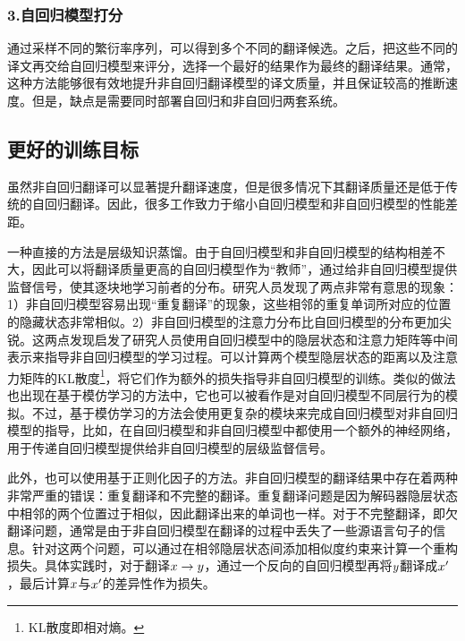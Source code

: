 \subsubsection{3.自回归模型打分}

\parinterval 通过采样不同的繁衍率序列，可以得到多个不同的翻译候选。之后，把这些不同的译文再交给自回归模型来评分，选择一个最好的结果作为最终的翻译结果。通常，这种方法能够很有效地提升非自回归翻译模型的译文质量，并且保证较高的推断速度。但是，缺点是需要同时部署自回归和非自回归两套系统。


\subsection{更好的训练目标}

\parinterval 虽然非自回归翻译可以显著提升翻译速度，但是很多情况下其翻译质量还是低于传统的自回归翻译。因此，很多工作致力于缩小自回归模型和非自回归模型的性能差距。

\parinterval 一种直接的方法是层级知识蒸馏。由于自回归模型和非自回归模型的结构相差不大，因此可以将翻译质量更高的自回归模型作为“教师”，通过给非自回归模型提供监督信号，使其逐块地学习前者的分布。研究人员发现了两点非常有意思的现象：1）非自回归模型容易出现“重复翻译”的现象，这些相邻的重复单词所对应的位置的隐藏状态非常相似。2）非自回归模型的注意力分布比自回归模型的分布更加尖锐。这两点发现启发了研究人员使用自回归模型中的隐层状态和注意力矩阵等中间表示来指导非自回归模型的学习过程。可以计算两个模型隐层状态的距离以及注意力矩阵的KL散度\footnote{KL散度即相对熵。}，将它们作为额外的损失指导非自回归模型的训练。类似的做法也出现在基于模仿学习的方法中，它也可以被看作是对自回归模型不同层行为的模拟。不过，基于模仿学习的方法会使用更复杂的模块来完成自回归模型对非自回归模型的指导，比如，在自回归模型和非自回归模型中都使用一个额外的神经网络，用于传递自回归模型提供给非自回归模型的层级监督信号。

\parinterval 此外，也可以使用基于正则化因子的方法。非自回归模型的翻译结果中存在着两种非常严重的错误：重复翻译和不完整的翻译。重复翻译问题是因为解码器隐层状态中相邻的两个位置过于相似，因此翻译出来的单词也一样。对于不完整翻译，即欠翻译问题，通常是由于非自回归模型在翻译的过程中丢失了一些源语言句子的信息。针对这两个问题，可以通过在相邻隐层状态间添加相似度约束来计算一个重构损失。具体实践时，对于翻译${x}\to{y}$，通过一个反向的自回归模型再将${y}$翻译成${x'}$，最后计算${x}$与${x'}$的差异性作为损失。


